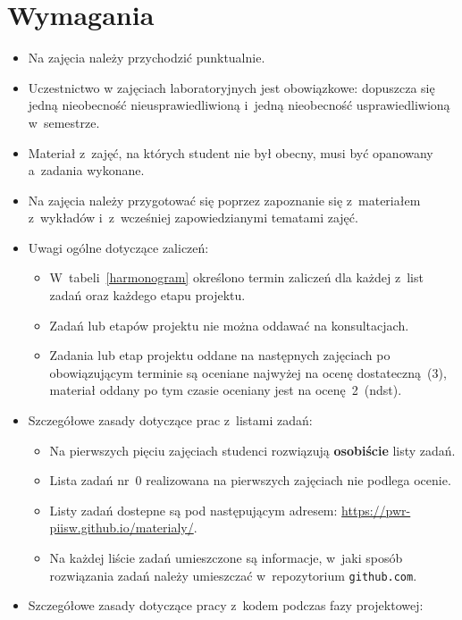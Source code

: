 \documentclass[12pt]{article}
\begin{document}
    \section*{Wymagania}
        \begin{itemize}
            \item Na zajęcia należy przychodzić punktualnie.
            \item Uczestnictwo w zajęciach laboratoryjnych jest obowiązkowe: dopuszcza się jedną nieobecność nieusprawiedliwioną i~jedną nieobecność usprawiedliwioną w~semestrze.
            \item Materiał z~zajęć, na których student nie był obecny, musi być opanowany a~zadania wykonane.
            \item Na zajęcia należy przygotować się poprzez zapoznanie się z~materiałem z~wykładów i~z~wcześniej zapowiedzianymi tematami zajęć.
            \item Uwagi ogólne dotyczące zaliczeń:
                \begin{itemize}
                    \item W~tabeli~\ref{harmonogram} określono termin zaliczeń dla każdej z~list zadań oraz każdego etapu projektu.
                    \item Zadań lub etapów projektu nie można oddawać na konsultacjach.
                    \item Zadania lub etap projektu oddane na następnych zajęciach po obowiązującym terminie są oceniane najwyżej na ocenę dostateczną~(3), materiał oddany po tym czasie oceniany jest na ocenę~2~(ndst).
                \end{itemize}
            \item Szczegółowe zasady dotyczące prac z~listami zadań:
                \begin{itemize}
                    \item Na pierwszych pięciu zajęciach studenci rozwiązują \textbf{osobiście} listy zadań.
                    \item Lista zadań nr~0 realizowana na pierwszych zajęciach nie podlega ocenie.
                    \item Listy zadań dostepne są pod następującym adresem: \url{https://pwr-piisw.github.io/materialy/}.
                    \item Na każdej liście zadań umieszczone są informacje, w~jaki sposób rozwiązania zadań należy umieszczać w~repozytorium \texttt{github.com}.
                \end{itemize}
            \item Szczegółowe zasady dotyczące pracy z~kodem podczas fazy projektowej:

\end{itemize}
\end{document}
